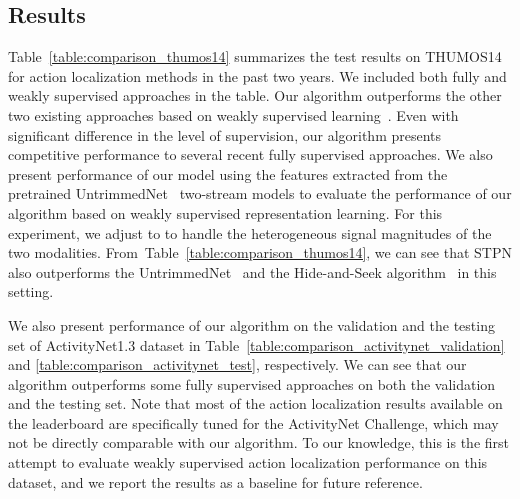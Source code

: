 \documentclass[10pt,twocolumn,letterpaper]{article}
\begin{document}
\subsection{Results}
\label{sub:results}
Table~\ref{table:comparison_thumos14} summarizes the test results on THUMOS14 for action localization methods in the past two years.
We included both fully and weakly supervised approaches in the table.
Our algorithm outperforms the other two existing approaches based on weakly supervised learning~\cite{wang17untrimmednets,singh17hide}. 
Even with significant difference in the level of supervision, our algorithm presents competitive performance to several recent fully supervised approaches.
We also present performance of our model using the features extracted from the pretrained UntrimmedNet~\cite{wang17untrimmednets} two-stream models to evaluate the performance of our algorithm based on weakly supervised representation learning. 
For this experiment, we adjust  to  to handle the heterogeneous signal magnitudes of the two modalities.
From~Table~\ref{table:comparison_thumos14}, we can see that STPN also outperforms the UntrimmedNet~\cite{wang17untrimmednets} and the Hide-and-Seek algorithm~\cite{singh17hide} in this setting.

We also present performance of our algorithm on the validation and the testing set of ActivityNet1.3 dataset in Table~\ref{table:comparison_activitynet_validation} and \ref{table:comparison_activitynet_test}, respectively.
We can see that our algorithm outperforms some fully supervised approaches on both the validation and the testing set.
Note that most of the action localization results available on the leaderboard are specifically tuned for the ActivityNet Challenge, which may not be directly comparable with our algorithm.
To our knowledge, this is the first attempt to evaluate weakly supervised action localization performance on this dataset, and we report the results as a baseline for future reference.
\end{document}
